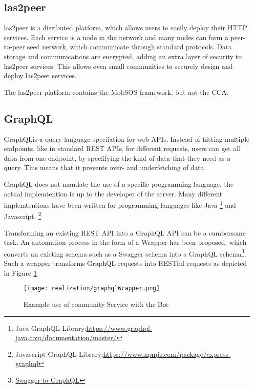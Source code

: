 \subsection{las2peer}
las2peer is a disributed platform, which allows users to easily deploy their HTTP services. Each service is a node in the network and many nodes can form a peer-to-peer seed network, which communicate through standard protocols. Data storage and communications are encrypted, adding an extra layer of security to las2peer services. This allows even small communities to securely design and deploy las2peer services.

The las2peer platform contains the MobSOS framework, but not the CCA.

\subsection{GraphQL}
GraphQL\footnotemark is a query language specifation for web APIs.
Instead of hitting multiple endpoints, like in standard REST APIs, for different requests, users can get all data from one endpoint, by specfifying the kind of data that they need as a query. This means that it prevents over- and underfetching of data.\footnotemark


GraphQL does not mandate the use of a specific programming language, the actual implemtention is up to the developer of the server. \footnotemark
{}
Many different implemtentions have been written for programming languages like Java \footnote{Java GraphQL Library:\href{https://www.graphql-java.com/documentation/master/}{https://www.graphql-java.com/documentation/master/}} and Javascript. \footnote{Javascript GraphQL Library:\href{https://www.npmjs.com/package/express-graphql}{https://www.npmjs.com/package/express-graphql}}

Transforming an existing REST API into a GraphQL API can be a cumbersome task. An automation process in the form of a Wrapper has been proposed, which converts an existing schema such as a Swagger schema into a GraphQL schema\footnote{\href{https://github.com/yarax/swagger-to-graphql}{Swagger-to-GraphQL}}. Such a wrapper transforms GraphQL requests into RESTful requests as depicted in Figure \ref{fig:graphqlWrapper}.
\begin{figure}[h]
	\centering
	\texttt{[image: realization/graphqlWrapper.png]}
	\caption{Example use of community Service with the Bot}
	\label{fig:graphqlWrapper}
\end{figure}

